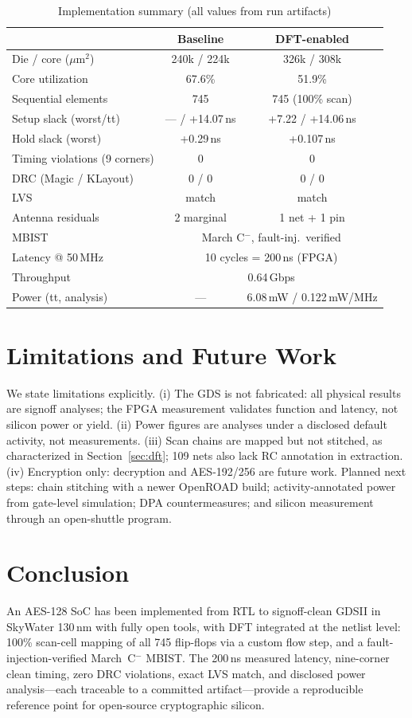\documentclass[conference]{IEEEtran}
\begin{document}
\begin{table}[htbp]
\caption{Implementation summary (all values from run artifacts)}
\label{tab:summary}
\centering
\footnotesize
\setlength{\tabcolsep}{3.0pt}
\begin{tabular}{lcc}
\toprule
 & Baseline & DFT-enabled \\
\midrule
Die / core ($\mu$m$^2$) & 240k / 224k & 326k / 308k \\
Core utilization & 67.6\% & 51.9\% \\
Sequential elements & 745 & 745 (100\% scan) \\
Setup slack (worst/tt) & --- / +14.07\,ns & +7.22 / +14.06\,ns \\
Hold slack (worst) & +0.29\,ns & +0.107\,ns \\
Timing violations (9 corners) & 0 & 0 \\
DRC (Magic / KLayout) & 0 / 0 & 0 / 0 \\
LVS & match & match \\
Antenna residuals & 2 marginal & 1 net + 1 pin \\
MBIST & \multicolumn{2}{c}{March C$^-$, fault-inj.\ verified} \\
Latency @ 50\,MHz & \multicolumn{2}{c}{10 cycles = 200\,ns (FPGA)} \\
Throughput & \multicolumn{2}{c}{0.64\,Gbps} \\
Power (tt, analysis) & --- & 6.08\,mW / 0.122\,mW/MHz \\
\bottomrule
\end{tabular}
\end{table}

\section{Limitations and Future Work}
We state limitations explicitly. (i) The GDS is not fabricated: all physical
results are signoff analyses; the FPGA measurement validates function and
latency, not silicon power or yield. (ii) Power figures are analyses under a
disclosed default activity, not measurements. (iii) Scan chains are mapped
but not stitched, as characterized in Section~\ref{sec:dft}; 109 nets also
lack RC annotation in extraction. (iv) Encryption only: decryption and
AES-192/256 are future work. Planned next steps: chain stitching with a
newer OpenROAD build; activity-annotated power from gate-level simulation;
DPA countermeasures; and silicon measurement through an open-shuttle
program.

\section{Conclusion}
An AES-128 SoC has been implemented from RTL to signoff-clean GDSII in
SkyWater 130\,nm with fully open tools, with DFT integrated at the netlist
level: 100\% scan-cell mapping of all 745 flip-flops via a custom flow step,
and a fault-injection-verified March~C$^-$ MBIST. The 200\,ns measured
latency, nine-corner clean timing, zero DRC violations, exact LVS match, and
disclosed power analysis---each traceable to a committed artifact---provide
a reproducible reference point for open-source cryptographic silicon.
\end{document}
